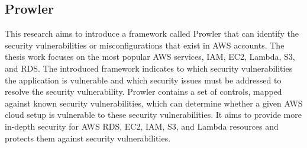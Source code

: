 {\subsection{Prowler}

\par This research aims to introduce a framework called Prowler that can identify the security vulnerabilities or misconfigurations that exist in AWS accounts.
The thesis work focuses on the most popular AWS services,
IAM,
EC2, Lambda, S3, and RDS.
The introduced framework indicates to which security vulnerabilities the application is vulnerable and which security issues must be addressed to resolve the security vulnerability.
Prowler contains a set of controls, mapped against known security vulnerabilities, which can determine whether a given AWS cloud setup is vulnerable to these security vulnerabilities.
It aims to provide more in-depth security for AWS RDS,
EC2, IAM, S3, and Lambda resources and protects them
against security vulnerabilities.\\

}
